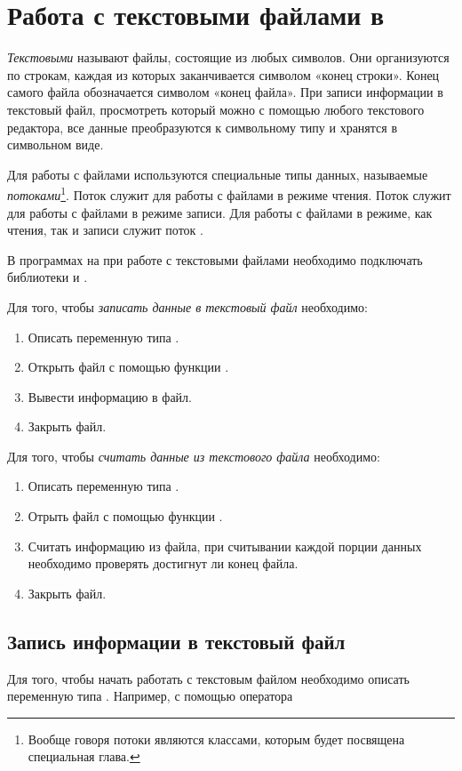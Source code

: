 \section[Работа с текстовыми файлами в \Sys{C++}]{Работа с текстовыми файлами в }\label{ch07:2}
\emph{Текстовыми} называют файлы, состоящие из любых символов. Они организуются по
строкам, каждая из которых заканчивается символом «конец строки». Конец самого файла обозначается символом «конец
файла». При записи информации в текстовый файл, просмотреть который можно с помощью любого текстового редактора, все
данные преобразуются к символьному типу и хранятся в символьном виде.

Для работы с файлами используются специальные типы данных, называемые
\emph{потоками}\footnote{Вообще говоря потоки являются классами, которым будет посвящена
специальная глава.}. Поток  служит для работы с файлами в режиме чтения. Поток
 служит для работы с файлами в режиме записи. Для работы с файлами в режиме, как чтения, так
и записи служит поток .

В программах на  при работе с текстовыми файлами необходимо подключать библиотеки  и
.

Для того, чтобы \emph{записать данные в текстовый файл} необходимо:
\begin{enumerate}
\item Описать переменную типа .
\item Открыть файл с помощью функции .
\item Вывести информацию в файл.
\item Закрыть файл.
\end{enumerate}

Для того, чтобы \emph{считать данные из текстового файла} необходимо:
\begin{enumerate}
\item Описать переменную типа .
\item Отрыть файл с помощью функции .
\item Считать информацию из файла, при считывании каждой порции данных необходимо проверять достигнут ли конец файла.
\item Закрыть файл.
\end{enumerate}

\subsection[Запись информации в текстовый файл]{Запись информации в текстовый файл}
Для того, чтобы начать работать с текстовым файлом необходимо описать переменную типа .
Например, с помощью оператора

